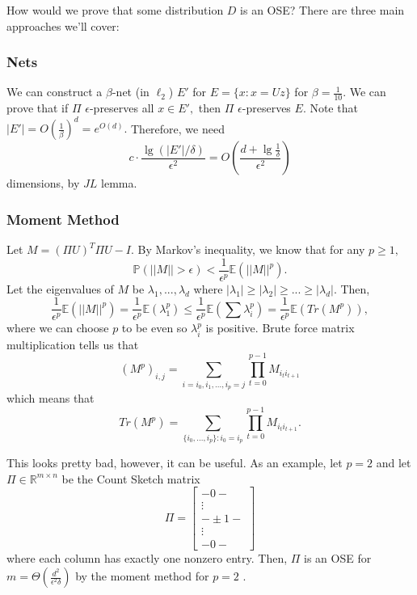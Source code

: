 \documentclass[11pt]{article}
\begin{document}
How would we prove that some distribution $D$ is an OSE?  There are three main approaches we'll cover:

\subsubsection{Nets}

We can construct a $\beta$-net (in $\ell_2$) $E'$ for $E = \{x: x = Uz\}$ for $\beta = \frac{1}{10}$.  We can prove that if $\Pi$ $\epsilon$-preserves all $x \in E',$ then $\Pi$ $\epsilon$-preserves $E$.  Note that $|E'| = O(\frac{1}{\beta})^d = e^{O(d)}.$  Therefore, we need $$c \cdot \frac{\lg (|E'|/\delta)}{\epsilon^2} = O\left(\frac{d+ \lg \frac{1}{\delta}}{\epsilon^2}\right)$$ dimensions, by $JL$ lemma.

\subsubsection{Moment Method}

Let $M = (\Pi U)^T \Pi U - I.$  By Markov's inequality, we know that for any $p \ge 1,$ $$\mathbb{P}(||M|| > \epsilon) < \frac{1}{\epsilon^p} \mathbb{E}(||M||^p).$$  Let the eigenvalues of $M$ be $\lambda_1, ..., \lambda_d$ where $|\lambda_1| \ge |\lambda_2| \ge ... \ge |\lambda_d|.$  Then, $$\frac{1}{\epsilon^p} \mathbb{E}(||M||^p) = \frac{1}{\epsilon^p} \mathbb{E}(\lambda_1^p) \le \frac{1}{\epsilon^p} \mathbb{E}(\sum \lambda_i^p) = \frac{1}{\epsilon^p} \mathbb{E}(Tr(M^p)),$$ where we can choose $p$ to be even so $\lambda_i^p$ is positive.  Brute force matrix multiplication tells us that $$(M^p)_{i, j} = \sum\limits_{i = i_0, i_1, ..., i_p = j} \prod\limits_{t = 0}^{p-1} M_{i_ti_{t+1}}$$ which means that $$Tr(M^p) = \sum\limits_{\{i_0, ..., i_p\}: i_0 = i_p} \prod\limits_{t = 0}^{p-1} M_{i_ti_{t+1}}.$$  

This looks pretty bad, however, it can be useful.  As an example, let $p = 2$ and let $\Pi \in \mathbb{R}^{m \times n}$ be the Count Sketch matrix $$\Pi = \begin{bmatrix} -0 -\\ \vdots \\ - \pm 1 - \\ \vdots \\ - 0 - \end{bmatrix}$$ where each column has exactly one nonzero entry.  Then, $\Pi$ is an OSE for $m = \Theta(\frac{d^2}{\epsilon^2 \delta})$ by the moment method for $p = 2$ \cite{ClarksonWoodruff}\cite{NelsonNguyen}\cite{MahoneyMeng}.
\end{document}
